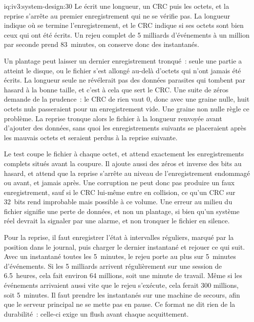 \begin{solution}{iq:iv3:system-design:30}
Le  écrit une longueur, un CRC puis les octets, et la reprise s'arrête au premier enregistrement qui ne se vérifie pas. La longueur indique où se termine l'enregistrement, et le CRC indique si ses octets sont bien ceux qui ont été écrits. Un rejeu complet de 5 milliards d'événements à un million par seconde prend 83~minutes, on conserve donc des instantanés.
\label{lst:iv3:sd:journal}

Un plantage peut laisser un dernier enregistrement tronqué~: seule une partie a atteint le disque, ou le fichier s'est allongé au-delà d'octets qui n'ont jamais été écrits. La longueur seule ne révélerait pas des données parasites qui tombent par hasard à la bonne taille, et c'est à cela que sert le CRC. Une suite de zéros demande de la prudence~: le CRC de rien vaut 0, donc avec une graine nulle, huit octets nuls passeraient pour un enregistrement vide. Une graine non nulle règle ce problème. La reprise tronque alors le fichier à la longueur renvoyée avant d'ajouter des données, sans quoi les enregistrements suivants se placeraient après les mauvais octets et seraient perdus à la reprise suivante.

Le test coupe le fichier à chaque octet, et attend exactement les enregistrements complets situés avant la coupure. Il ajoute aussi des zéros et inverse des bits au hasard, et attend que la reprise s'arrête au niveau de l'enregistrement endommagé ou avant, et jamais après. Une corruption ne peut donc pas produire un faux enregistrement, sauf si le CRC lui-même entre en collision, ce qu'un CRC sur 32~bits rend improbable mais possible à ce volume. Une erreur au milieu du fichier signifie une perte de données, et non un plantage, si bien qu'un système réel devrait la signaler par une alarme, et non tronquer le fichier en silence.

Pour la reprise, il faut enregistrer l'état à intervalles réguliers, marqué par la position dans le journal, puis charger le dernier instantané et rejouer ce qui suit. Avec un instantané toutes les 5~minutes, le rejeu porte au plus sur 5~minutes d'événements. Si les 5 milliards arrivent régulièrement sur une session de 6.5~heures, cela fait environ 64 millions, soit une minute de travail. Même si les événements arrivaient aussi vite que le rejeu s'exécute, cela ferait 300 millions, soit 5~minutes. Il faut prendre les instantanés sur une machine de secours, afin que le serveur principal ne se mette pas en pause. Ce format ne dit rien de la durabilité~: celle-ci exige un flush avant chaque acquittement.

\end{solution}

